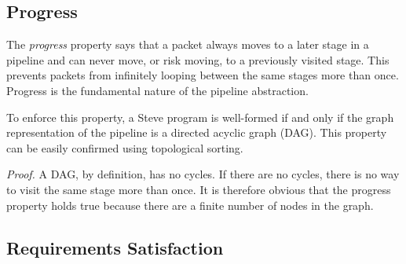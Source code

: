 \subsection{Progress} \label{guide:progress}

The \textit{progress} property says that a packet always moves to a later stage in a pipeline and can never move, or risk moving, to a previously visited stage. 
This prevents packets from infinitely looping between the same stages more than once.
Progress is the fundamental nature of the pipeline abstraction. 

To enforce this property, a Steve program is well-formed if and only if the graph representation of the pipeline is a directed acyclic graph (DAG). This property can be easily confirmed using topological sorting.

\textit{Proof.} A DAG, by definition, has no cycles. If there are no cycles, there is no way to visit the same stage more than once. It is therefore obvious that the
progress property holds true because there are a finite number of nodes in the graph.

%
%

\subsection{Requirements Satisfaction} \label{guide:requirements}

